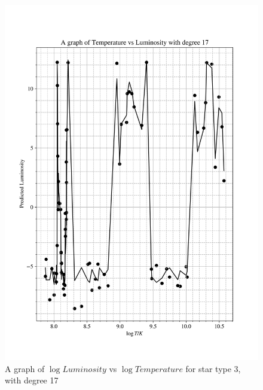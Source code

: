 \documentclass[12pt, a4paper]{article}
\begin{document}
\begin{figure}[H]
    \centering
    \includegraphics[width = \textwidth]{2Plot4_17.png}
    \caption{A graph of \(\log{Luminosity}\) vs \(\log{Temperature}\) for star type 3, with degree 17}
\end{figure}
\end{document}
